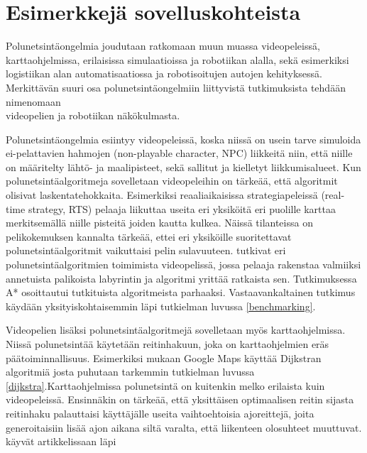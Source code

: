 \section{Esimerkkejä sovelluskohteista}\label{eSuovelluskohteista}
Polunetsintäongelmia joudutaan ratkomaan muun muassa videopeleissä, 
karttaohjelmissa, erilaisissa simulaatioissa ja robotiikan alalla,
\cite{ACMHindawi} sekä esimerkiksi logistiikan alan automatisaatiossa ja 
robotisoitujen autojen kehityksessä.\cite{arXivMAPF} Merkittävän suuri 
osa polunetsintäongelmiin liittyvistä tutkimuksista tehdään nimenomaan 
\\videopelien\cite{MathewAndMalathy}\cite{ACMHindawi}\cite{mazeGameTrilogi}
ja robotiikan\cite{ACMHindawi}\cite{DelaunayVoronoiAStar} näkökulmasta.\par
	Polunetsintäongelmia esiintyy videopeleissä, koska niissä on usein 
tarve simuloida ei-pelattavien hahmojen (non-playable character, NPC) 
liikkeitä niin, että niille on määritelty lähtö- ja maalipisteet, sekä 
sallitut ja kielletyt liikkumisalueet. Kun polunetsintäalgoritmeja 
sovelletaan videopeleihin on tärkeää, että algoritmit olisivat 
laskentatehokkaita. Esimerkiksi reaaliaikaisissa strategiapeleissä 
(real-time strategy, RTS) pelaaja liikuttaa useita eri yksiköitä eri puolille 
karttaa merkitsemällä niille pisteitä joiden kautta kulkea. Näissä 
tilanteissa on pelikokemuksen kannalta tärkeää, ettei eri yksiköille 
suoritettavat polunetsintäalgoritmit vaikuttaisi pelin 
sulavuuteen.\cite{MathewAndMalathy} \textcite{mazeGameTrilogi} tutkivat 
eri polunetsintäalgoritmien toimimista videopelissä, jossa pelaaja rakenstaa 
valmiiksi annetuista palikoista labyrintin ja algoritmi yrittää ratkaista 
sen. Tutkimuksessa A* osoittautui tutkituista algoritmeista parhaaksi. 
Vastaavankaltainen tutkimus käydään yksityiskohtaisemmin läpi tutkielman 
luvussa \ref{benchmarking}. \par
	Videopelien lisäksi polunetsintäalgoritmejä sovelletaan myös 
karttaohjelmissa. Niissä polunetsintää käytetään reitinhakuun, joka on 
karttaohjelmien eräs päätoiminnallisuus. Esimerkiksi 
\textcite{applSciLawande} mukaan Google Maps käyttää Dijkstran algoritmiä 
josta puhutaan tarkemmin tutkielman luvussa \ref{dijkstra}.Karttaohjelmissa 
polunetsintä on kuitenkin melko erilaista kuin videopeleissä. Ensinnäkin on 
tärkeää, että yksittäisen optimaalisen reitin sijasta reitinhaku palauttaisi 
käyttäjälle useita vaihtoehtoisia ajoreittejä, joita generoitaisiin lisää 
ajon aikana siltä varalta, että liikenteen olosuhteet 
muuttuvat.\cite{Lanelet2} \textcite{Lanelet2} käyvät artikkelissaan läpi 
